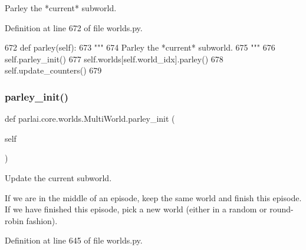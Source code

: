 \begin{DoxyVerb}Parley the *current* subworld.
\end{DoxyVerb}
 

Definition at line 672 of file worlds.\+py.


\begin{DoxyCode}
672     \textcolor{keyword}{def }parley(self):
673         \textcolor{stringliteral}{"""}
674 \textcolor{stringliteral}{        Parley the *current* subworld.}
675 \textcolor{stringliteral}{        """}
676         self.parley\_init()
677         self.worlds[self.world\_idx].parley()
678         self.update\_counters()
679 
\end{DoxyCode}
\mbox{\label{classparlai_1_1core_1_1worlds_1_1MultiWorld_a9f2f4de7791e3b295359039e9d26a523}} 
\subsubsection{\texorpdfstring{parley\+\_\+init()}{parley\_init()}}
{\footnotesize\ttfamily def parlai.\+core.\+worlds.\+Multi\+World.\+parley\+\_\+init (\begin{DoxyParamCaption}\item[{}]{self }\end{DoxyParamCaption})}

\begin{DoxyVerb}Update the current subworld.

If we are in the middle of an episode, keep the same world and finish this
episode. If we have finished this episode, pick a new world (either in a random
or round-robin fashion).
\end{DoxyVerb}
 

Definition at line 645 of file worlds.\+py.


